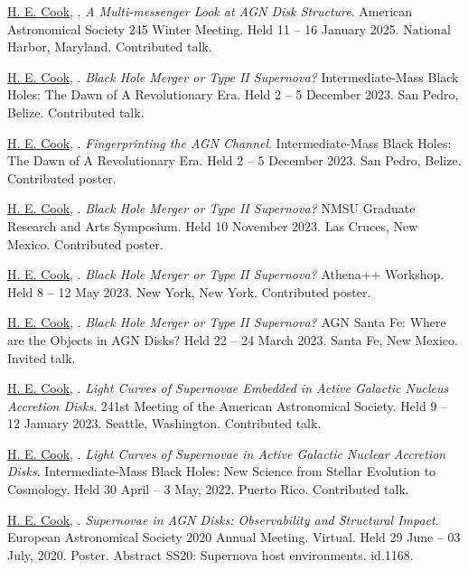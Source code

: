 \hangindent=0.5in \noindent \underline{H. E. Cook}, . \textit{A Multi-messenger Look at AGN Disk Structure}. American Astronomical Society 245 Winter Meeting. Held 11 -- 16 January 2025. National Harbor, Maryland. Contributed talk.

\hangindent=0.5in \noindent \underline{H. E. Cook}, . \textit{Black Hole Merger or Type II Supernova?} Intermediate-Mass Black Holes: The Dawn of A Revolutionary Era. Held 2 -- 5 December 2023. San Pedro, Belize. Contributed talk.

\hangindent=0.5in \noindent \underline{H. E. Cook}, . \textit{Fingerprinting the AGN Channel}. Intermediate-Mass Black Holes: The Dawn of A Revolutionary Era. Held 2 -- 5 December 2023. San Pedro, Belize. Contributed poster.

\hangindent=0.5in \noindent \underline{H. E. Cook}, . \textit{Black Hole Merger or Type II Supernova?} NMSU Graduate Research and Arts Symposium. Held 10 November 2023. Las Cruces, New Mexico. Contributed poster.

\hangindent=0.5in \noindent \underline{H. E. Cook}, . \textit{Black Hole Merger or Type II  Supernova?} Athena++ Workshop. Held 8 -- 12 May 2023. New York, New York. Contributed poster.

\hangindent=0.5in \noindent \underline{H. E. Cook}, . \textit{Black Hole Merger or Type II  Supernova?} AGN Santa Fe: Where are the Objects in AGN Disks? Held 22 -- 24 March 2023. Santa Fe, New Mexico. Invited talk.

\hangindent=0.5in \noindent \underline{H. E. Cook}, . \textit{Light Curves of Supernovae Embedded in Active Galactic Nucleus Accretion Disks}. 241st Meeting of the American Astronomical Society. Held 9 -- 12 January 2023. Seattle, Washington. Contributed talk.

\hangindent=0.5in \noindent \underline{H. E. Cook}, . \textit{Light Curves of Supernovae in Active Galactic Nuclear Accretion Disks}. Intermediate-Mass Black Holes: New Science from Stellar Evolution to Cosmology. Held 30 April -- 3 May, 2022. Puerto Rico. Contributed talk.

\hangindent=0.5in \noindent \underline{H. E. Cook}, . \textit{Supernovae in AGN Disks: Observability and Structural Impact}. European Astronomical Society 2020 Annual Meeting. Virtual. Held 29 June -- 03 July, 2020. Poster. Abstract SS20: Supernova host environments. id.1168.



